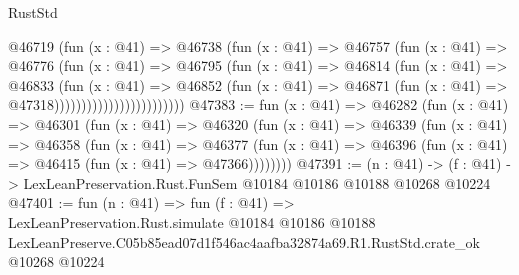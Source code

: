 \begin{lexlean}{RustStd}
\begin{coremodule}
                                @46719
                                  (fun (x : @41) =>
                                  @46738
                                    (fun (x : @41) =>
                                    @46757
                                      (fun (x : @41) =>
                                      @46776
                                        (fun (x : @41) =>
                                        @46795
                                          (fun (x : @41) =>
                                          @46814
                                            (fun (x : @41) =>
                                            @46833
                                              (fun (x : @41) =>
                                              @46852
                                                (fun (x : @41) =>
                                                @46871
                                                  (fun (x : @41) => @47318))))))))))))))))))))))))
@47383 := fun (x : @41) =>
  @46282
    (fun (x : @41) =>
    @46301
      (fun (x : @41) =>
      @46320
        (fun (x : @41) =>
        @46339
          (fun (x : @41) =>
          @46358
            (fun (x : @41) =>
            @46377
              (fun (x : @41) => @46396 (fun (x : @41) => @46415 (fun (x : @41) => @47366))))))))
@47391 := (n : @41) ->
  (f : @41) -> LexLeanPreservation.Rust.FunSem @10184 @10186 @10188 @10268 @10224
@47401 := fun (n : @41) =>
  fun (f : @41) =>
  LexLeanPreservation.Rust.simulate
    @10184
    @10186
    @10188
    LexLeanPreserve.C05b85ead07d1f546ac4aafba32874a69.R1.RustStd.crate_ok
    @10268
    @10224
\end{coremodule}
\end{lexlean}

